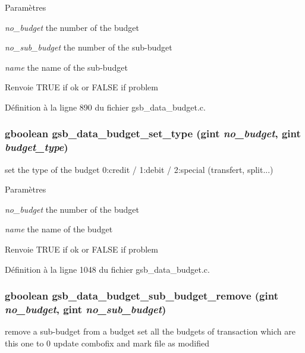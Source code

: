 \begin{DoxyParams}{Paramètres}
\item[{\em no\_\-budget}]the number of the budget \item[{\em no\_\-sub\_\-budget}]the number of the sub-\/budget \item[{\em name}]the name of the sub-\/budget\end{DoxyParams}
\begin{DoxyReturn}{Renvoie}
TRUE if ok or FALSE if problem 
\end{DoxyReturn}


Définition à la ligne 890 du fichier gsb\_\-data\_\-budget.c.

\subsubsection[{gsb\_\-data\_\-budget\_\-set\_\-type}]{\setlength{\rightskip}{0pt plus 5cm}gboolean gsb\_\-data\_\-budget\_\-set\_\-type (gint {\em no\_\-budget}, \/  gint {\em budget\_\-type})}\label{gsb__data__budget_8h_a18a43763864f599ceed2d20b79616042}
set the type of the budget 0:credit / 1:debit / 2:special (transfert, split...)


\begin{DoxyParams}{Paramètres}
\item[{\em no\_\-budget}]the number of the budget \item[{\em name}]the name of the budget\end{DoxyParams}
\begin{DoxyReturn}{Renvoie}
TRUE if ok or FALSE if problem 
\end{DoxyReturn}


Définition à la ligne 1048 du fichier gsb\_\-data\_\-budget.c.

\subsubsection[{gsb\_\-data\_\-budget\_\-sub\_\-budget\_\-remove}]{\setlength{\rightskip}{0pt plus 5cm}gboolean gsb\_\-data\_\-budget\_\-sub\_\-budget\_\-remove (gint {\em no\_\-budget}, \/  gint {\em no\_\-sub\_\-budget})}\label{gsb__data__budget_8h_ad30a7dbc9af5632fac4fd916de04db66}
remove a sub-\/budget from a budget set all the budgets of transaction which are this one to 0 update combofix and mark file as modified


